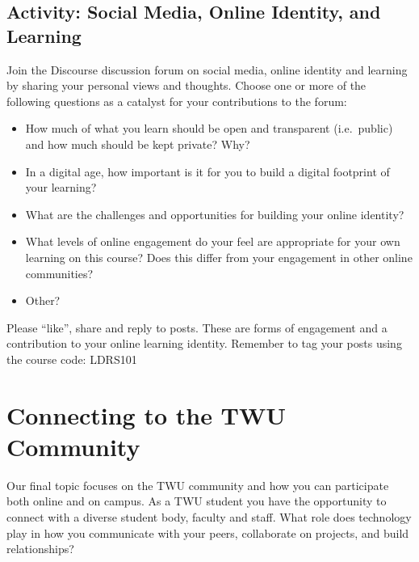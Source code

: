 \documentclass[
]{book}
\providecommand{\tightlist}{%
  \setlength{\itemsep}{0pt}\setlength{\parskip}{0pt}}
\theoremstyle{definition}
\theoremstyle{definition}
\theoremstyle{definition}
\theoremstyle{definition}
\theoremstyle{remark}
\begin{document}
\hypertarget{activity-social-media-online-identity-and-learning}{%
\subsection*{Activity: Social Media, Online Identity, and Learning}\label{activity-social-media-online-identity-and-learning}}

\begin{reflect}
Join the Discourse discussion forum on social media, online identity and learning by sharing your personal views and thoughts. Choose one or more of the following questions as a catalyst for your contributions to the forum:

\begin{itemize}
\tightlist
\item
  How much of what you learn should be open and transparent (i.e.~public) and how much should be kept private? Why?\\
\item
  In a digital age, how important is it for you to build a digital footprint of your learning?\\
\item
  What are the challenges and opportunities for building your online identity?\\
\item
  What levels of online engagement do your feel are appropriate for your own learning on this course? Does this differ from your engagement in other online communities?\\
\item
  Other?
\end{itemize}

Please ``like'', share and reply to posts. These are forms of engagement and a contribution to your online learning identity. Remember to tag your posts using the course code: LDRS101
\end{reflect}

\hypertarget{connecting-to-the-twu-community}{%
\section{Connecting to the TWU Community}\label{connecting-to-the-twu-community}}

Our final topic focuses on the TWU community and how you can participate both online and on campus. As a TWU student you have the opportunity to connect with a diverse student body, faculty and staff. What role does technology play in how you communicate with your peers, collaborate on projects, and build relationships?
\end{document}
